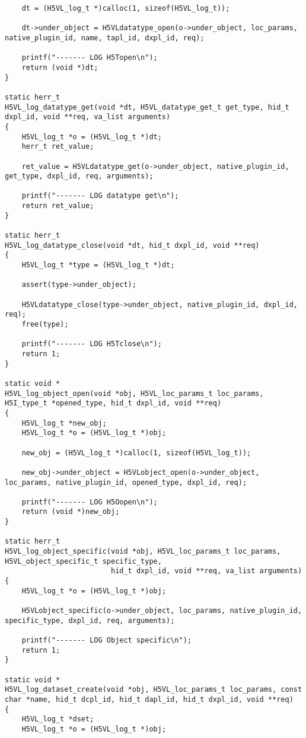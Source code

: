 \begin{lstlisting}
    dt = (H5VL_log_t *)calloc(1, sizeof(H5VL_log_t));

    dt->under_object = H5VLdatatype_open(o->under_object, loc_params, native_plugin_id, name, tapl_id, dxpl_id, req);

    printf("------- LOG H5Topen\n");
    return (void *)dt;
}

static herr_t 
H5VL_log_datatype_get(void *dt, H5VL_datatype_get_t get_type, hid_t dxpl_id, void **req, va_list arguments)
{
    H5VL_log_t *o = (H5VL_log_t *)dt;
    herr_t ret_value;

    ret_value = H5VLdatatype_get(o->under_object, native_plugin_id, get_type, dxpl_id, req, arguments);

    printf("------- LOG datatype get\n");
    return ret_value;
}

static herr_t 
H5VL_log_datatype_close(void *dt, hid_t dxpl_id, void **req)
{
    H5VL_log_t *type = (H5VL_log_t *)dt;

    assert(type->under_object);

    H5VLdatatype_close(type->under_object, native_plugin_id, dxpl_id, req);
    free(type);

    printf("------- LOG H5Tclose\n");
    return 1;
}

static void *
H5VL_log_object_open(void *obj, H5VL_loc_params_t loc_params, H5I_type_t *opened_type, hid_t dxpl_id, void **req)
{
    H5VL_log_t *new_obj;
    H5VL_log_t *o = (H5VL_log_t *)obj;

    new_obj = (H5VL_log_t *)calloc(1, sizeof(H5VL_log_t));
    
    new_obj->under_object = H5VLobject_open(o->under_object, loc_params, native_plugin_id, opened_type, dxpl_id, req);

    printf("------- LOG H5Oopen\n");
    return (void *)new_obj;
}

static herr_t 
H5VL_log_object_specific(void *obj, H5VL_loc_params_t loc_params, H5VL_object_specific_t specific_type, 
                         hid_t dxpl_id, void **req, va_list arguments)
{
    H5VL_log_t *o = (H5VL_log_t *)obj;

    H5VLobject_specific(o->under_object, loc_params, native_plugin_id, specific_type, dxpl_id, req, arguments);

    printf("------- LOG Object specific\n");
    return 1;
}

static void *
H5VL_log_dataset_create(void *obj, H5VL_loc_params_t loc_params, const char *name, hid_t dcpl_id, hid_t dapl_id, hid_t dxpl_id, void **req) 
{
    H5VL_log_t *dset;
    H5VL_log_t *o = (H5VL_log_t *)obj;


\end{lstlisting}
